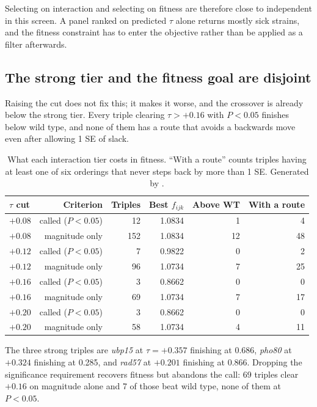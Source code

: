 Selecting on interaction and selecting on fitness are therefore close to
independent in this screen. A panel ranked on predicted $\tau$ alone returns
mostly sick strains, and the fitness constraint has to enter the objective rather
than be applied as a filter afterwards.

\subsection{The strong tier and the fitness goal are disjoint}

Raising the cut does not fix this; it makes it worse, and the crossover is
already below the strong tier. Every triple clearing $\tau > +0.16$ with
$P < 0.05$ finishes below wild type, and none of them has a route that avoids a
backwards move even after allowing 1 SE of slack.

\begin{table}[H]
\centering
\footnotesize
\begin{tabular}{lrrrrr}
\toprule
$\tau$ cut & Criterion & Triples & Best $f_{ijk}$ & Above WT & With a route \\
\midrule
$+0.08$ & called ($P<0.05$) & 12  & 1.0834 & 1  & 4  \\
$+0.08$ & magnitude only    & 152 & 1.0834 & 12 & 48 \\
$+0.12$ & called ($P<0.05$) & 7   & 0.9822 & 0  & 2  \\
$+0.12$ & magnitude only    & 96  & 1.0734 & 7  & 25 \\
$+0.16$ & called ($P<0.05$) & 3   & 0.8662 & 0  & 0  \\
$+0.16$ & magnitude only    & 69  & 1.0734 & 7  & 17 \\
$+0.20$ & called ($P<0.05$) & 3   & 0.8662 & 0  & 0  \\
$+0.20$ & magnitude only    & 58  & 1.0734 & 4  & 11 \\
\bottomrule
\end{tabular}
\caption{What each interaction tier costs in fitness. ``With a route'' counts
triples having at least one of six orderings that never steps back by more than
1 SE. Generated by
\protect{}.}
\end{table}

The three strong triples are \emph{ubp15} at $\tau = +0.357$ finishing at 0.686,
\emph{pho80} at $+0.324$ finishing at 0.285, and \emph{rad57} at $+0.201$
finishing at 0.866. Dropping the significance requirement recovers fitness but
abandons the call: 69 triples clear $+0.16$ on magnitude alone and 7 of those
beat wild type, none of them at $P < 0.05$.

